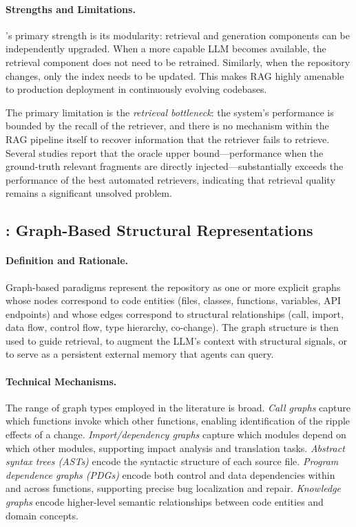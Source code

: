 \paragraph{Strengths and Limitations.}
's primary strength is its modularity: retrieval and generation components can be
independently upgraded. When a more capable LLM becomes available, the retrieval component
does not need to be retrained. Similarly, when the repository changes, only the index needs
to be updated. This makes RAG highly amenable to production deployment in continuously evolving
codebases.

The primary limitation is the \emph{retrieval bottleneck}: the system's performance is bounded
by the recall of the retriever, and there is no mechanism within the RAG pipeline itself to
recover information that the retriever fails to retrieve. Several studies report that the
oracle upper bound---performance when the ground-truth relevant fragments are directly
injected---substantially exceeds the performance of the best automated retrievers, indicating
that retrieval quality remains a significant unsolved problem.

\subsection{: Graph-Based Structural Representations}
\label{subsec:par3}

\paragraph{Definition and Rationale.}
Graph-based paradigms represent the repository as one or more explicit graphs whose nodes
correspond to code entities (files, classes, functions, variables, API endpoints) and whose
edges correspond to structural relationships (call, import, data flow, control flow, type
hierarchy, co-change). The graph structure is then used to guide retrieval, to augment the
LLM's context with structural signals, or to serve as a persistent external memory that
agents can query.

\paragraph{Technical Mechanisms.}
The range of graph types employed in the literature is broad. \emph{Call graphs} capture which
functions invoke which other functions, enabling identification of the ripple effects of a
change. \emph{Import/dependency graphs} capture which modules depend on which other modules,
supporting impact analysis and translation tasks. \emph{Abstract syntax trees (ASTs)} encode
the syntactic structure of each source file. \emph{Program dependence graphs (PDGs)} encode
both control and data dependencies within and across functions, supporting precise bug
localization and repair. \emph{Knowledge graphs} encode higher-level semantic relationships
between code entities and domain concepts.

